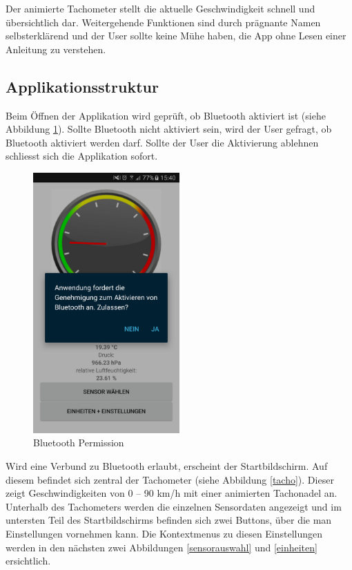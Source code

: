Der animierte Tachometer stellt die aktuelle Geschwindigkeit schnell und übersichtlich dar. Weitergehende Funktionen sind durch prägnante Namen selbsterklärend und der User sollte keine Mühe haben, die App ohne Lesen einer Anleitung zu verstehen.

\subsection{Applikationsstruktur}

Beim Öffnen der Applikation wird geprüft, ob Bluetooth aktiviert ist (siehe Abbildung \ref{permission}). Sollte Bluetooth nicht aktiviert sein, wird der User gefragt, ob Bluetooth aktiviert werden darf. Sollte der User die Aktivierung ablehnen schliesst sich die Applikation sofort.

\begin{figure}[ht]
    \includegraphics[width=0.5\textwidth]{4Resultate/imag/BLEBluetoothPermission.png} 
    \caption{Bluetooth Permission}
    \label{permission}
\end{figure}

Wird eine Verbund zu Bluetooth erlaubt, erscheint der Startbildschirm. Auf diesem befindet sich zentral der Tachometer (siehe Abbildung \ref{tacho}). Dieser zeigt Geschwindigkeiten von 0 – 90 km/h mit einer animierten Tachonadel an. Unterhalb des Tachometers werden die einzelnen Sensordaten angezeigt und im untersten Teil des Startbildschirms befinden sich zwei Buttons, über die man Einstellungen vornehmen kann. Die Kontextmenus zu diesen Einstellungen werden in den nächsten zwei Abbildungen \ref{sensorauswahl} und \ref{einheiten} ersichtlich. 

